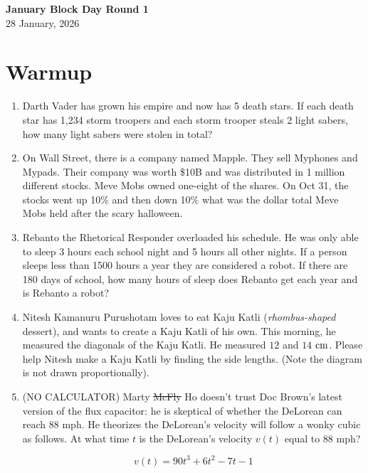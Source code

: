 \documentclass[a4paper]{article}
\begin{document}
\begin{center}
{\Large\bfseries January Block Day Round 1}\\[0.25cm]
{\large 28 January, 2026}\\[1cm]
\end{center}

\section*{Warmup}
\begin{enumerate}[itemsep=2cm]
    \item Darth Vader has grown his empire and now has 5 death stars. If each death star has 1,234 storm troopers and each storm trooper steals 2 light sabers, how many light sabers were stolen in total?
    \item On Wall Street, there is a company named Mapple. They sell Myphones and Mypads. Their company was worth \$10B and was distributed in 1 million different stocks. Meve Mobs owned one-eight of the shares. On Oct 31, the stocks went up 10\% and then down 10\% what was the dollar total Meve Mobs held after the scary halloween.
    \item Rebanto the Rhetorical Responder overloaded his schedule. He was only able to sleep 3 hours each school night and 5 hours all other nights. If a person sleeps less than 1500 hours a year they are considered a robot. If there are 180 days of school, how many hours of sleep does Rebanto get each year and is Rebanto a robot?    
    \item Nitesh Kamanuru Purushotam loves to eat Kaju Katli (\textit{rhombus-shaped} dessert), and wants to create a Kaju Katli of his own. This morning, he measured the diagonals of the Kaju Katli. He measured $12$ and $14$ $\rm cm$. Please help Nitesh make a Kaju Katli by finding the side lengths. (Note the diagram is not drawn proportionally).
    
    \vspace{0.5cm}
    \begin{center}
    \end{center}
    \item (NO CALCULATOR) Marty \sout{McFly} Ho doesn't trust Doc Brown's latest version of the flux capacitor: he is skeptical of whether the DeLorean can reach 88 mph. He theorizes the DeLorean's velocity will follow a wonky cubic as follows. At what time $t$ is the DeLorean's velocity $v(t)$ equal to 88 mph?

    $$v(t) = 90t^3+6t^2-7t-1$$
    

    \end{enumerate}
\end{document}
